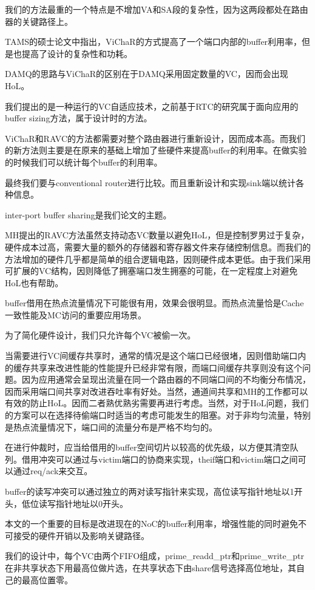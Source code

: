 \documentclass[10pt,journal]{IEEEtran}
\begin{document}
我们的方法最重的一个特点是不增加VA和SA段的复杂性，因为这两段都处在路由器的关键路径上。

TAMS的硕士论文中指出，ViChaR的方式提高了一个端口内部的buffer利用率，但是也提高了设计的复杂性和功耗。

DAMQ的思路与ViChaR的区别在于DAMQ采用固定数量的VC，因而会出现HoL。

我们提出的是一种运行的VC自适应技术，之前基于RTC的研究属于面向应用的buffer sizing方法，属于设计时的方法。

ViChaR和RAVC的方法都需要对整个路由器进行重新设计，因而成本高。而我们的新方法则主要是在原来的基础上增加了些硬件来提高buffer的利用率。在做实验的时候我们可以统计每个buffer的利用率。

最终我们要与conventional router进行比较。而且重新设计和实现sink端以统计各种信息。

inter-port buffer sharing是我们论文的主题。

MH提出的RAVC方法虽然支持动态VC数量以避免HoL，但是控制罗男过于复杂，硬件成本过高，需要大量的额外的存储器和寄存器文件来存储控制信息。而我们的方法增加的硬件几乎都是简单的组合逻辑电路，因则硬件成本更低。由于我们采用可扩展的VC结构，因则降低了拥塞端口发生拥塞的可能，在一定程度上对避免HoL也有帮助。

buffer借用在热点流量情况下可能很有用，效果会很明显。而热点流量恰是Cache一致性能及MC访问的重要应用场景。

为了简化硬件设计，我们只允许每个VC被偷一次。

当需要进行VC间缓存共享时，通常的情况是这个端口已经很堵，因则借助端口内的缓存共享来改进性能的性能提升已经非常有限，而端口间缓存共享则没有这个问题。因为应用通常会呈现出流量在同一个路由器的不同端口间的不均衡分布情况，因而采用端口间共享对改进吞吐率有好处。当然，通道间共享和MH的工作都可以有效的防止HoL。因而二者熟优熟劣需要再进行考虑。当然，对于HoL问题，我们的方案可以在选择待偷端口时适当的考虑可能发生的阻塞。对于非均匀流量，特别是热点流量情况下，端口间的流量分布是严格不均匀的。

在进行仲裁时，应当给借用的buffer空间切片以较高的优先级，以方便其清空队列。借用冲突可以通过与victim端口的协商来实现，theif端口和victim端口之间可以通过req/ack来交互。

buffer的读写冲突可以通过独立的两对读写指针来实现，高位读写指针地址以1开头，低位读写指针地址以0开头。

本文的一个重要的目标是改进现在的NoC的buffer利用率，增强性能的同时避免不可接受的硬件开销以及影响关键路径。

我们的设计中，每个VC由两个FIFO组成，prime\_readd\_ptr和prime\_write\_ptr在非共享状态下用最高位做片选，在共享状态下由share信号选择高位地址，其自己的最高位置零。
\end{document}
